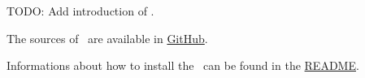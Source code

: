 %



%

TODO: Add introduction of \pkg.

The sources of \pkg\ are available in \href{https://github.com/test-fullautomation/python-microservice-cleware-switch}{GitHub}.

Informations about how to install the \pkg\ can be found in the \href{https://github.com/test-fullautomation/python-microservice-cleware-switch/blob/develop/README.rst}{README}.

